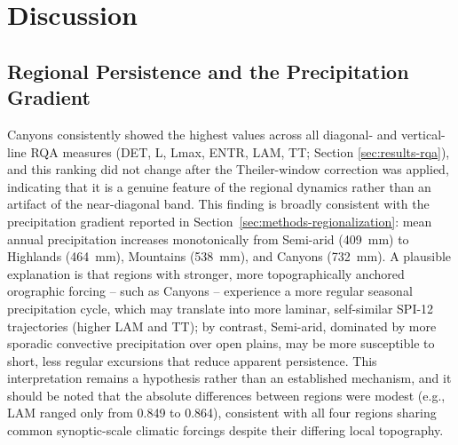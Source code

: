 \documentclass[climate,article,submit,moreauthors]{Definitions/mdpi}
\begin{document}
\section{Discussion}
\label{sec:discussion}

\subsection{Regional Persistence and the Precipitation Gradient}
\label{sec:disc-persistence}

Canyons consistently showed the highest values across all diagonal- and
vertical-line RQA measures (DET, L, Lmax, ENTR, LAM, TT; Section
\ref{sec:results-rqa}), and this ranking did not change after the
Theiler-window correction was applied, indicating that it is a genuine
feature of the regional dynamics rather than an artifact of the near-diagonal
band. This finding is broadly consistent with the precipitation gradient
reported in Section~\ref{sec:methods-regionalization}: mean annual
precipitation increases monotonically from Semi-arid (409~mm) to Highlands
(464~mm), Mountains (538~mm), and Canyons (732~mm). A plausible explanation
is that regions with stronger, more topographically anchored orographic
forcing -- such as Canyons -- experience a more regular seasonal
precipitation cycle, which may translate into more laminar, self-similar
SPI-12 trajectories (higher LAM and TT); by contrast, Semi-arid, dominated by
more sporadic convective precipitation over open plains, may be more
susceptible to short, less regular excursions that reduce apparent
persistence. This interpretation remains a hypothesis rather than an
established mechanism, and it should be noted that the absolute differences
between regions were modest (e.g., LAM ranged only from 0.849 to 0.864),
consistent with all four regions sharing common synoptic-scale climatic
forcings despite their differing local topography.
\end{document}
